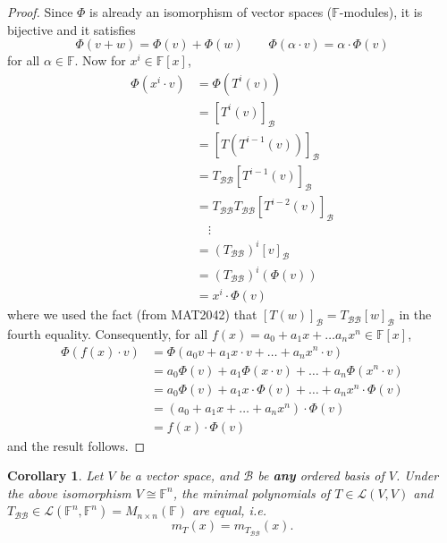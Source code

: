 \documentclass[11pt,openany]{book}
\theoremstyle{plain}
\newtheorem{corollary}[corollary]{Corollary}
\theoremstyle{definition}
\theoremstyle{remark}
\begin{document}
\begin{proof}
    Since $\Phi$ is already an isomorphism of vector spaces ($\mathbb{F}$-modules), it is bijective and it satisfies
    $$\Phi(v + w) = \Phi(v) + \Phi(w) \quad \quad \Phi(\alpha \cdot v) = \alpha \cdot \Phi(v)$$
    for all $\alpha \in \mathbb{F}$. Now for $x^i \in \mathbb{F}[x]$,
    \begin{align*}
    \Phi(x^i \cdot v) &= \Phi (T^i(v)) \\
    &= [T^{i}(v)]_{\mathcal{B}} \\
    &= [T(T^{i-1}(v))]_{\mathcal{B}} \\ 
    &= T_{\mathcal{B}\mathcal{B}}[T^{i-1}(v)]_{\mathcal{B}} \\
    &= T_{\mathcal{B}\mathcal{B}}T_{\mathcal{B}\mathcal{B}}[T^{i-2}(v)]_{\mathcal{B}} \\
    & \quad \vdots \\
    &= (T_{\mathcal{B}\mathcal{B}})^i[v]_{\mathcal{B}} \\
    &= (T_{\mathcal{B}\mathcal{B}})^i(\Phi(v)) \\
    &= x^i \cdot \Phi(v)
    \end{align*}
where we used the fact (from MAT2042) that $[T(w)]_{\mathcal{B}} = T_{\mathcal{B}\mathcal{B}}[w]_{\mathcal{B}}$ in the fourth equality. Consequently, for all $f(x) = a_0 + a_1x + \dots a_nx^n \in \mathbb{F}[x]$,
    \begin{align*}
    \Phi(f(x) \cdot v) &= \Phi (a_0v + a_1x \cdot v + \dots + a_nx^n \cdot v) \\
    &= a_0\Phi (v) + a_1\Phi(x \cdot v) + \dots + a_n\Phi(x^n \cdot v) \\
    &= a_0\Phi (v) + a_1x \cdot \Phi(v) + \dots + a_nx^n \cdot \Phi(v) \\
    &= (a_0+ a_1x + \dots + a_nx^n) \cdot \Phi(v) \\
    &= f(x) \cdot \Phi(v)
    \end{align*}
and the result follows.  
\end{proof}

\begin{corollary}
    Let $V$ be a vector space, and $\mathcal{B}$ be {\bf any} ordered basis of $V$. Under the above isomorphism $V \cong \mathbb{F}^n$, the minimal polynomials of $T \in \mathcal{L}(V,V)$ and $T_{\mathcal{B}\mathcal{B}} \in \mathcal{L}(\mathbb{F}^n, \mathbb{F}^n) = M_{n \times n}(\mathbb{F})$ are equal, i.e.
    $$m_T(x) = m_{T_{\mathcal{B}\mathcal{B}}}(x).$$
\end{corollary}
\end{document}
